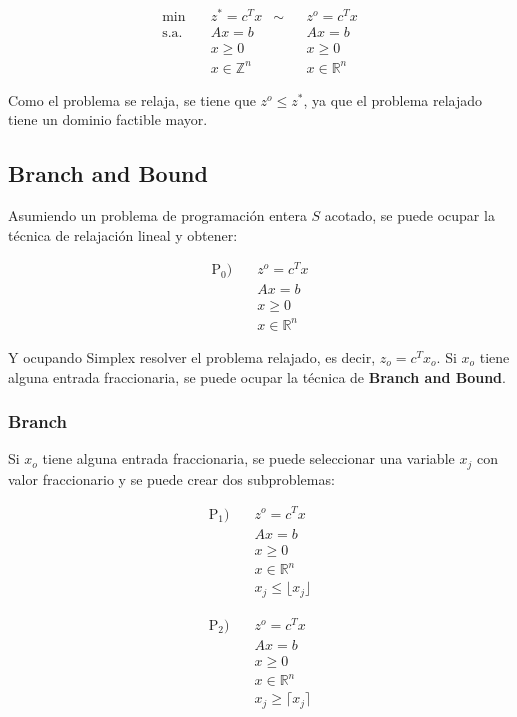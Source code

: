 \documentclass{article}
\begin{document}
\begin{align*}
    \min \quad & z^* = c^T x & \sim && z^o = c^T x \\
    \text{s.a.} \quad & Ax = b & && Ax = b \\
    & x \geq 0 &&& x \geq 0 \\
    & x \in \mathbb{Z}^n &&& x \in \mathbb{R}^n
\end{align*}

Como el problema se relaja, se tiene que $z^o \leq z^*$, ya que el problema relajado tiene un dominio factible mayor.

\subsection{Branch and Bound}

Asumiendo un problema de programación entera $S$ acotado, se puede ocupar la técnica de relajación lineal y obtener:

\begin{align*}
    \text{P}_0) \quad & z^o = c^T x \\
    & Ax = b \\
    & x \geq 0 \\
    & x \in \mathbb{R}^n
\end{align*}

Y ocupando Simplex resolver el problema relajado, es decir, $z_o = c^T x_o$. Si $x_o$ tiene alguna entrada fraccionaria, se puede ocupar la técnica de \textbf{Branch and Bound}.

\subsubsection{Branch}

Si $x_o$ tiene alguna entrada fraccionaria, se puede seleccionar una variable $x_j$ con valor fraccionario y se puede crear dos subproblemas:

\begin{align*}
    \text{P}_1) \quad & z^o = c^T x \\
    & Ax = b \\
    & x \geq 0 \\
    & x \in \mathbb{R}^n \\
    & x_j \leq \lfloor x_j \rfloor
\end{align*}

\begin{align*}
    \text{P}_2) \quad & z^o = c^T x \\
    & Ax = b \\
    & x \geq 0 \\
    & x \in \mathbb{R}^n \\
    & x_j \geq \lceil x_j \rceil
\end{align*}
\end{document}
